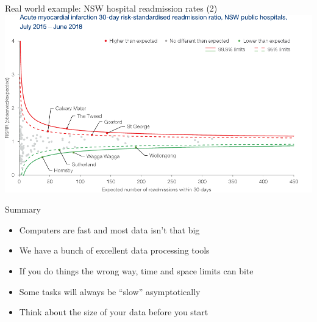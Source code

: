 \documentclass[aspectratio=169,12pt,usepdftitle=false]{beamer} %
\begin{document}
\begin{frame}{Real world example: NSW hospital readmission rates (2)}
\centering
\includegraphics[height=0.8\textheight]
	{ref/ami-rsrr.pdf}


\end{frame}

\begin{frame}{Summary}
    \begin{itemize}
	\item Computers are fast and most data isn't that big
	\item We have a bunch of excellent data processing tools
	\item If you do things the wrong way, time and space limits can bite
	\item Some tasks will always be ``slow'' asymptotically
	\item Think about the size of your data before you start
    \end{itemize}
\end{frame}

%
%
%
%






\end{document}
